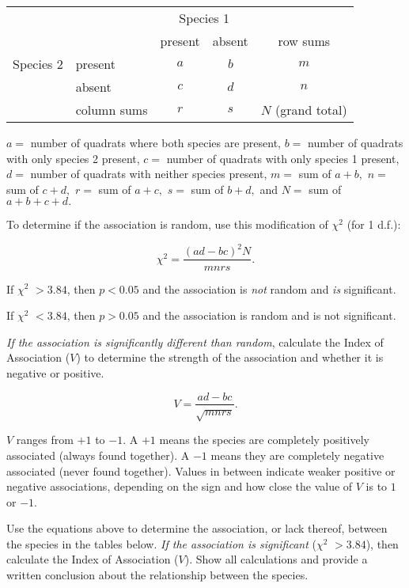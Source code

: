 \documentclass[12pt, hidelinks]{exam}
\newcommand\chisq{$\chi^2$}
\begin{document}
\begin{longtable}{@{}llccc@{}}
\toprule
& & \multicolumn{2}{c}{Species 1} &\tabularnewline
\cline{3-4}
& & present &absent& row sums\tabularnewline
\midrule
Species 2 & present & $a$ & $b$ & $m$ \tabularnewline

	& absent & $c$ & $d$ & $n$ \tabularnewline
\midrule
	& column sums & $r$ & $s$ & $N$ (grand total) \tabularnewline
\bottomrule
\end{longtable}

$a =$ number of quadrats where both species are present,\newline
$b =$ number of quadrats with only species 2 present,\newline
$c =$ number of quadrats with only species 1 present,\newline
$d =$ number of quadrats with neither species present,\newline
$m =$ sum of $a+b,$\newline
$n =$ sum of $c+d,$\newline
$r =$ sum of $a+c,$\newline
$s =$ sum of $b+d,$ and\newline
$N =$ sum of $a+b+c+d.$

To determine if the association is random, use this
modification of \chisq{} (for 1 d.f.):


\[\chi^2 = \dfrac{(ad-bc)^2N}{mnrs}.\]

If \chisq{} $>3.84$, then $p<0.05$ and the
association is \emph{not} random and \emph{is} significant.

If \chisq{} $<3.84$, then $p>0.05$ and the
association is random and is not significant.

\emph{If the association is significantly different than random}, calculate the Index of Association ($V$) to determine the
strength of the association and whether it is negative or positive.\vspace*{-\baselineskip}

\[V = \dfrac{ad-bc}{\sqrt{mnrs}}.\]

$V$ ranges from $+1$ to $-1$. A $+1$ means the species are completely
positively associated (always found together). A $-1$ means they are
completely negative associated (never found together). Values in between
indicate weaker positive or negative associations, depending on the sign
and how close the value of $V$ is to $1$ or $-1$.

Use the equations above to determine the association, or lack thereof,
between the species in the tables below. \emph{If the association is
significant} (\chisq{} $>3.84$), then calculate
the Index of Association ($V$). Show all calculations and provide a
written conclusion about the relationship between the species.
\end{document}
